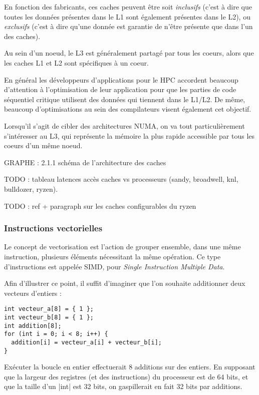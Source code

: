 En fonction des fabricants, ces caches peuvent être soit \emph{inclusifs} (c'est à dire que toutes les données présentes dans le L1 sont également présentes dans le L2), ou \emph{exclusifs} (c'est à dire qu'une donnée est garantie de n'être présente que dans l'un des caches).

Au sein d'un noeud, le L3 est généralement partagé par tous les coeurs, alors que les caches L1 et L2 sont spécifiques à un coeur.

En général les développeurs d'applications pour le HPC accordent beaucoup d'attention à l'optimisation de leur application pour que les parties de code séquentiel critique utilisent des données qui tiennent dans le L1/L2.
De même, beaucoup d'optimisations au sein des compilateurs visent également cet objectif.

Lorsqu'il s'agit de cibler des architectures NUMA, on va tout particulièrement s'intéresser au L3, qui représente la mémoire la plus rapide accessible par tous les coeurs d'un même noeud.

GRAPHE : 2.1.1 schéma de l'architecture des caches

TODO : tableau latences accès caches vs processeurs (sandy, broadwell, knl, bulldozer, ryzen).

TODO : ref + paragraph sur les caches configurables du ryzen

\subsubsection{Instructions vectorielles}

Le concept de vectorisation est l'action de grouper ensemble, dans une même instruction, plusieurs éléments nécessitant la même opération.
Ce type d'instructions est appelée SIMD, pour \emph{Single Instruction Multiple Data}.

Afin d'illustrer ce point, il suffit d'imaginer que l'on souhaite additionner deux vecteurs d'entiers :
\begin{lstlisting}
int vecteur_a[8] = { 1 };
int vecteur_b[8] = { 1 };
int addition[8];
for (int i = 0; i < 8; i++) {
  addition[i] = vecteur_a[i] + vecteur_b[i];
}
\end{lstlisting}

Exécuter la boucle en entier effectuerait 8 additions sur des entiers.
En supposant que la largeur des registres (et des instructions) du processeur est de 64 bits, et que la taille d'un |int| est 32 bits, on gaspillerait en fait 32 bits par additions.

